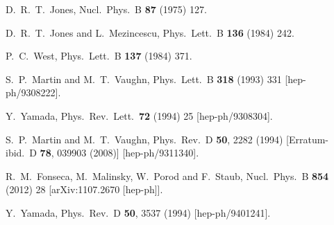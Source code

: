 \documentclass[final,3p,11pt,pdflatex]{elsarticle}
\begin{document}
\begin{thebibliography}{100}
  D.~R.~T.~Jones,
  Nucl.\ Phys.\ B {\bf 87} (1975) 127.

  D.~R.~T.~Jones and L.~Mezincescu,
  Phys.\ Lett.\ B {\bf 136} (1984) 242.

  P.~C.~West,
  Phys.\ Lett.\ B {\bf 137} (1984) 371.

  S.~P.~Martin and M.~T.~Vaughn,
  Phys.\ Lett.\ B {\bf 318} (1993) 331
  [hep-ph/9308222].

  Y.~Yamada,
  Phys.\ Rev.\ Lett.\  {\bf 72} (1994) 25
  [hep-ph/9308304].

  S.~P.~Martin and M.~T.~Vaughn,
  Phys.\ Rev.\ D {\bf 50}, 2282 (1994)
  [Erratum-ibid.\ D {\bf 78}, 039903 (2008)]
  [hep-ph/9311340].

  R.~M.~Fonseca, M.~Malinsky, W.~Porod and F.~Staub,
  Nucl.\ Phys.\ B {\bf 854} (2012) 28
  [arXiv:1107.2670 [hep-ph]].

  Y.~Yamada,
  Phys.\ Rev.\ D {\bf 50}, 3537 (1994)
  [hep-ph/9401241].


\end{thebibliography}
\end{document}

